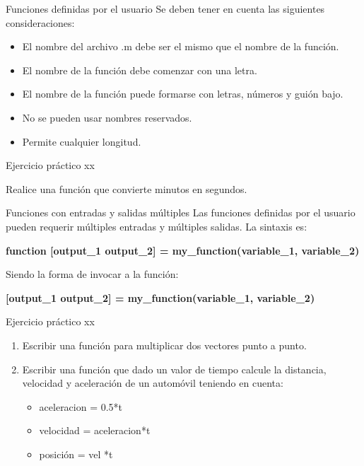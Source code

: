 \documentclass{bredelebeamer}
\begin{document}
\begin{frame}{Funciones definidas por el usuario}
Se deben tener en cuenta las siguientes consideraciones:
\begin{itemize}
\item El nombre del archivo .m debe ser el mismo que el nombre de la función.
\item El nombre de la función debe comenzar con una letra.
\item El nombre de la función puede formarse con letras, números y guión bajo.
\item No se pueden usar nombres reservados.
\item Permite cualquier longitud.
\end{itemize}
\end{frame}

\begin{frame}{Ejercicio práctico xx}
\begin{center}
Realice una función que convierte minutos en segundos.
\end{center}
\end{frame}

\begin{frame}{Funciones con entradas y salidas múltiples}
Las funciones definidas por el usuario pueden requerir múltiples entradas y múltiples salidas. La sintaxis es:\\
\begin{center}
\textbf{function [output\_1 output\_2] = my\_function(variable\_1, variable\_2)}
\end{center}
Siendo la forma de invocar a la función:
\begin{center}
\textbf{[output\_1 output\_2] = my\_function(variable\_1, variable\_2)}
\end{center}
\end{frame}

\begin{frame}{Ejercicio práctico xx}
\begin{enumerate}
\item Escribir una función para multiplicar dos vectores punto a punto.
\item Escribir una función que dado un valor de tiempo calcule la distancia, velocidad y aceleración de un automóvil teniendo en cuenta:
\begin{itemize}
\item aceleracion = 0.5*t
\item velocidad = aceleracion*t
\item posición = vel *t
\end{itemize}
\end{enumerate}
\end{frame}
\end{document}
